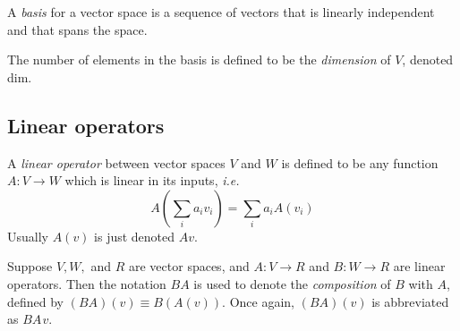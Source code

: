 \begin{definition}
A \emph{basis} for a vector space is a sequence of vectors that is linearly
independent and that spans the space.
\end{definition}

\begin{definition}
The number of elements in the basis is defined to be the \emph{dimension}  of
$V$, denoted \gls{dim}.
\end{definition}

\subsection{Linear operators}
A \emph{linear operator} between vector spaces $V$ and $W$ is defined to be any function $A : V \rightarrow W$ which is linear in its inputs, \textit{i.e.}
\begin{equation*}
  A \left( \sum_{i} a_{i} v_{i} \right) = \sum_{i} a_i A (v_{i})
\end{equation*}
Usually $A(v)$ is just denoted $A v$.

Suppose $V, W,$ and $R$ are vector spaces, and $A : V \rightarrow R$ and $B : W \rightarrow R$ are linear operators. Then the notation $BA$ is used  to denote the \emph{composition} of $B$ with $A$,
defined by $(BA)(v) \equiv B(A(v))$. Once again, $(BA)(v)$ is abbreviated as  $BA \hspace{1pt}v$.


